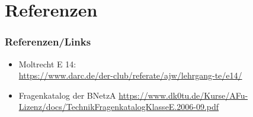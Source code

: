 \section*{Referenzen}
\begin{frame}
  \frametitle{Referenzen/Links}

  \footnotesize
  \begin{itemize}
    \item Moltrecht E 14: \\
      \url{https://www.darc.de/der-club/referate/ajw/lehrgang-te/e14/}
    \item Fragenkatalog der BNetzA
      \url{https://www.dk0tu.de/Kurse/AFu-Lizenz/docs/TechnikFragenkatalogKlasseE.2006-09.pdf}
  \end{itemize}

\end{frame}



